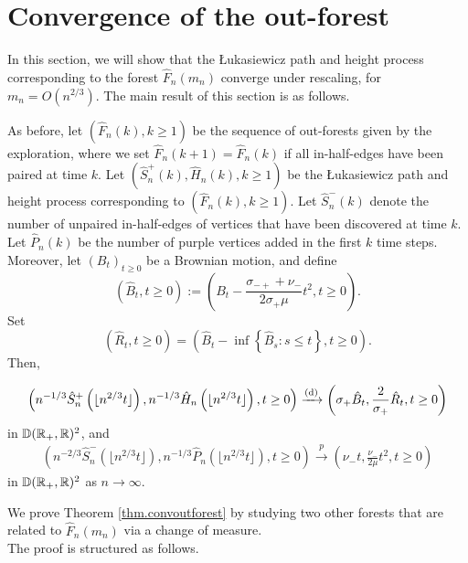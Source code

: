 \section{Convergence of the out-forest}\label{sec.convoutforest}
In this section, we will show that the \L ukasiewicz path and height process corresponding to the forest $\hat{F}_n(m_n)$ converge under rescaling, for $m_n=O(n^{2/3})$. 
The main result of this section is as follows. 

\begin{theorem}\label{thm.convoutforest}
As before, let $(\hat{F}_n(k),k\geq 1)$ be the sequence of out-forests given by the exploration, where we set $\hat{F}_n(k+1)=\hat{F}_n(k)$ if all in-half-edges have been paired at time $k$. Let $(\hat{S}^{+}_n(k),\hat{H}_n(k),k\geq 1)$ be the \L ukasiewicz path and height process corresponding to $(\hat{F}_n(k),k\geq 1)$. Let $\hat{S}^-_n(k)$ denote the number of unpaired in-half-edges of vertices that have been discovered at time $k$. Let $\hat{P}_n(k)$ be the number of purple vertices added in the first $k$ time steps. \\
Moreover, let $(B_t)_{t\geq 0}$ be a Brownian motion, and define
$$(\hat{B}_t,t\geq 0):=\left( B_t-\frac{\sigma_{-+}+\nu_-}{2\sigma_+ \mu}t^2, t\geq 0\right).$$ 
Set $$(\hat{R}_t,t\geq 0)= \left(\hat{B}_t-\inf\left\{\hat{B}_s: s\leq t\right\},t\geq 0\right).$$
Then,

\begin{align*}\left(n^{-1/3}\hat{S}^{+}_n\left(\lfloor n^{2/3}t\rfloor \right),n^{-1/3}\hat{H}_{n}\left(\lfloor n^{2/3}t\rfloor \right), t\geq 0\right)
\xrightarrow[]{\mathrm{(d)}}\left(\sigma_+ \hat{B}_t, \frac{2}{\sigma_+} \hat{R}_t, t\geq 0\right)\end{align*}
in ${\mathbb D}({\mathbb R}_+,{\mathbb R})^2$, and 
\begin{align*}\left( n^{-2/3}\hat{S}_n^-\left(\lfloor n^{2/3}t\rfloor \right), n^{-1/3}\hat{P}_n\left(\lfloor n^{2/3}t\rfloor \right), t\geq 0\right)\overset{p}{\to}\left(\nu_-t,  \frac{\nu_-}{2\mu} t^2, t\geq 0\right)\end{align*}
in ${\mathbb D}({\mathbb R}_+,{\mathbb R})^2$ as $n\to \infty$. 
\end{theorem}
We prove Theorem \ref{thm.convoutforest} by studying two other forests that are related to $\hat{F}_n(m_n)$ via a change of measure.  \\
The proof is structured as follows.
